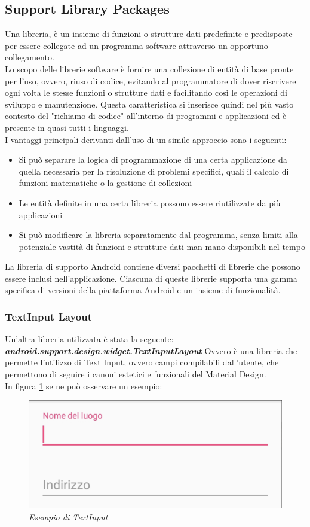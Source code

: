 \subsection{Support Library Packages}
Una libreria, è un insieme di funzioni o strutture dati predefinite e predisposte per essere collegate ad un programma software attraverso un opportuno collegamento.
\\Lo scopo delle librerie software è fornire una collezione di entità di base pronte per l'uso, ovvero, riuso di codice, evitando al programmatore di dover riscrivere ogni volta le stesse funzioni o strutture dati e facilitando così le operazioni di sviluppo e manutenzione. Questa caratteristica si inserisce quindi nel più vasto contesto del "richiamo di codice" all'interno di programmi e applicazioni ed è presente in quasi tutti i linguaggi. 
\\I vantaggi principali derivanti dall'uso di un simile approccio sono i seguenti:
\begin{itemize}
    \item Si può separare la logica di programmazione di una certa applicazione da quella necessaria per la risoluzione di problemi specifici, quali il calcolo di funzioni matematiche o la gestione di collezioni
    \item Le entità definite in una certa libreria possono essere riutilizzate da più applicazioni
    \item Si può modificare la libreria separatamente dal programma, senza limiti alla potenziale vastità di funzioni e strutture dati man mano disponibili nel tempo
\end{itemize}
La libreria di supporto Android contiene diversi pacchetti di librerie che possono essere inclusi nell'applicazione. Ciascuna di queste librerie supporta una gamma specifica di versioni della piattaforma Android e un insieme di funzionalità.
\subsubsection{TextInput Layout}
Un'altra libreria utilizzata è stata la seguente: \textit{\textbf{android.support.design.widget.TextInputLayout}}
Ovvero è una libreria che permette l'utilizzo di Text Input, ovvero campi compilabili dall'utente, che permettono di seguire i canoni estetici e funzionali del Material Design.
\\In figura \ref{fig:textInput} se ne può osservare un esempio:
\\\begin{figure}[!h]
    \centering
	\includegraphics[scale=0.20]{Tesi/images/TextInput}
	\caption{\textit{Esempio di TextInput}}
	\label{fig:textInput}
\end{figure}
